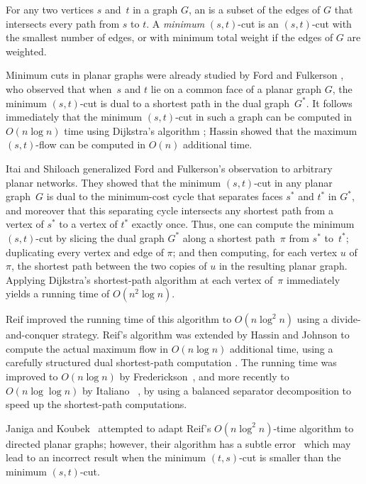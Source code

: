 \documentclass[letterpaper,review]{siamart190516}
\begin{document}
For any two vertices $s$ and~$t$ in a graph $G$, an  is a subset of the edges of $G$ that intersects every path from $s$ to $t$.  A \emph{minimum} $(s,t)$-cut is an $(s,t)$-cut with the smallest number of edges, or with minimum total weight if the edges of $G$ are weighted.

Minimum cuts in planar graphs were already studied by Ford and Fulkerson \cite{ff-mfn-56}, who observed that when~$s$ and $t$ lie on a common face of a planar graph $G$, the minimum $(s,t)$-cut is dual to a shortest path in the dual graph~$G^*$.  It follows immediately that the minimum $(s,t)$-cut in such a graph can be computed in $O(n\log n)$ time using Dijkstra's algorithm \cite{is-mfpn-79}; Hassin \cite{h-mfpn-81} showed that the maximum $(s,t)$-flow can be computed in $O(n)$ additional time.

Itai and Shiloach \cite{is-mfpn-79} generalized Ford and Fulkerson's observation to arbitrary planar networks.  They showed that the minimum $(s,t)$-cut in any planar graph~$G$ is dual to the minimum-cost cycle that separates faces $s^*$ and $t^*$ in $G^*$, and moreover that this separating cycle intersects any shortest path from a vertex of $s^*$ to a vertex of $t^*$ exactly once.  Thus, one can compute the minimum $(s,t)$-cut by slicing the dual graph $G^*$ along a shortest path~$\pi$ from $s^*$ to~$t^*$; duplicating every vertex and edge of $\pi$; and then computing, for each vertex $u$ of $\pi$, the shortest path between the two copies of $u$ in the resulting planar graph.  Applying Dijkstra's shortest-path algorithm at each vertex of~$\pi$ immediately yields a running time of $O(n^2\log n)$.

Reif \cite{r-mstcp-83} improved the running time of this algorithm to $O(n\log^2 n)$ using a divide-and-conquer strategy.  Reif's algorithm was extended by Hassin and Johnson to compute the actual maximum flow in $O(n\log n)$ additional time, using a carefully structured dual shortest-path computation \cite{hj-oamfu-85}.  The running time was improved to $O(n\log n)$ by Frederickson~\cite{f-faspp-87}, and more recently to $O(n\log\log n)$ by Italiano \etal~\cite{insw-iamcmf-11}, by using a balanced separator decomposition to speed up the shortest-path computations.

Janiga and Koubek~\cite{jk-mcdpn-92} attempted to adapt Reif's $O(n\log^2 n)$-time algorithm to directed planar graphs; however, their algorithm has a subtle error~\cite{kn-mcupg-11} which may lead to an incorrect result when the minimum $(t,s)$-cut is smaller than the minimum $(s,t)$-cut.
\end{document}
